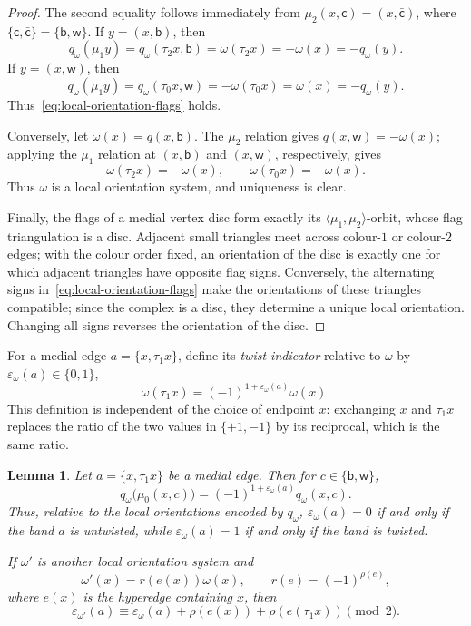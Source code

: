 \documentclass{article}
\newtheorem{lemma}[theorem]{Lemma}
\theoremstyle{definition}
\theoremstyle{remark}
\begin{document}
\begin{proof}
The second equality follows immediately from $\mu_2(x,\mathsf c)=(x,\bar{\mathsf c})$, where $\{\mathsf c,\bar{\mathsf c}\}=\{\mathsf b,{\mathsf w}\}$. If $y=(x,\mathsf b)$, then
\[
 q_\omega(\mu_1y)
 =q_\omega(\tau_2x,\mathsf b)
 =\omega(\tau_2x)=-\omega(x)=-q_\omega(y).
\]
If $y=(x,\mathsf w)$, then
\[
 q_\omega(\mu_1y)
 =q_\omega(\tau_0x,\mathsf w)
 =-\omega(\tau_0x)=\omega(x)=-q_\omega(y).
\]
Thus~\eqref{eq:local-orientation-flags} holds.

Conversely, let $\omega(x)=q(x,\mathsf b)$. The $\mu_2$ relation gives $q(x,\mathsf w)=-\omega(x)$; applying the $\mu_1$ relation at $(x,\mathsf b)$ and $(x,\mathsf w)$, respectively, gives
\[
  \omega(\tau_2x)=-\omega(x),\qquad
  \omega(\tau_0x)=-\omega(x).
\]
Thus $\omega$ is a local orientation system, and uniqueness is clear.

Finally, the flags of a medial vertex disc form exactly its $\langle\mu_1,\mu_2\rangle$-orbit, whose flag triangulation is a disc. Adjacent small triangles meet across colour-$1$ or colour-$2$ edges; with the colour order fixed, an orientation of the disc is exactly one for which adjacent triangles have opposite flag signs. Conversely, the alternating signs in~\eqref{eq:local-orientation-flags} make the orientations of these triangles compatible; since the complex is a disc, they determine a unique local orientation. Changing all signs reverses the orientation of the disc.
\end{proof}

For a medial edge $a=\{x,\tau_1x\}$, define its \emph{twist indicator} relative to $\omega$ by $\varepsilon_\omega(a)\in\{0,1\}$,
\[
 \omega(\tau_1x)=(-1)^{1+\varepsilon_\omega(a)}\omega(x).
 \tag{T}\label{eq:twist}
\]
This definition is independent of the choice of endpoint $x$: exchanging $x$ and $\tau_1x$ replaces the ratio of the two values in $\{+1,-1\}$ by its reciprocal, which is the same ratio.

\begin{lemma}\label{lem:twist-flag}
Let $a=\{x,\tau_1x\}$ be a medial edge. Then for $c\in\{\mathsf b,\mathsf w\}$,
\[
 q_\omega\bigl(\mu_0(x,c)\bigr)
 =(-1)^{1+\varepsilon_\omega(a)}q_\omega(x,c). \tag{U}
 \label{eq:twist-from-flags}
\]
Thus, relative to the local orientations encoded by $q_\omega$, $\varepsilon_\omega(a)=0$ if and only if the band $a$ is untwisted, while $\varepsilon_\omega(a)=1$ if and only if the band is twisted.

If $\omega'$ is another local orientation system and
\[
 \omega'(x)=r(e(x))\omega(x),\qquad
 r(e)=(-1)^{\rho(e)},
\]
where $e(x)$ is the hyperedge containing $x$, then
\[
 \varepsilon_{\omega'}(a)
 \equiv\varepsilon_\omega(a)+\rho(e(x))
 +\rho(e(\tau_1x))\pmod 2. \tag{S}\label{eq:twist-switch}
\]
\end{lemma}
\end{document}
